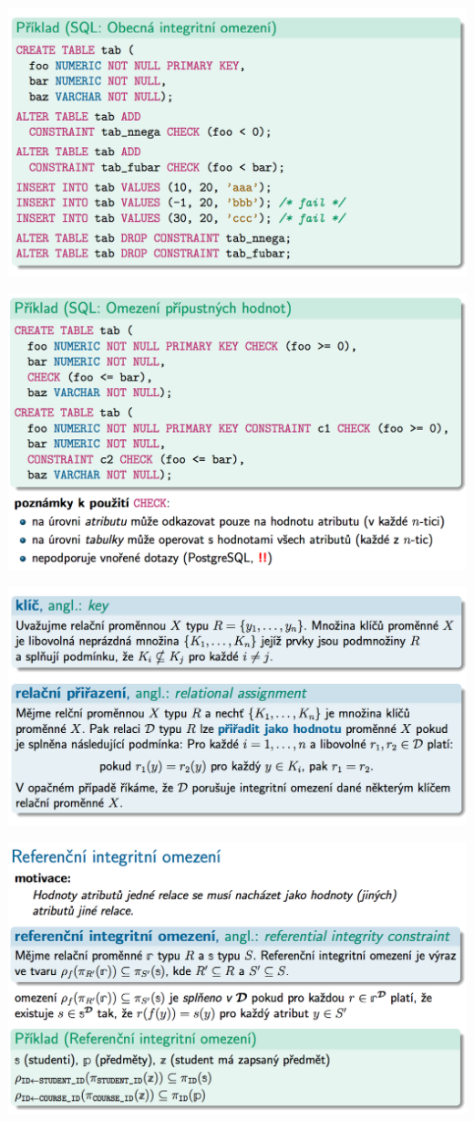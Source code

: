 \documentclass[10pt,a4paper]{article}
\begin{document}
	\includegraphics[scale=0.4]{img/62}
	
	\includegraphics[scale=0.4]{img/63}
	
	\includegraphics[scale=0.4]{img/64}
	
	\includegraphics[scale=0.4]{img/65}
	
\end{document}
